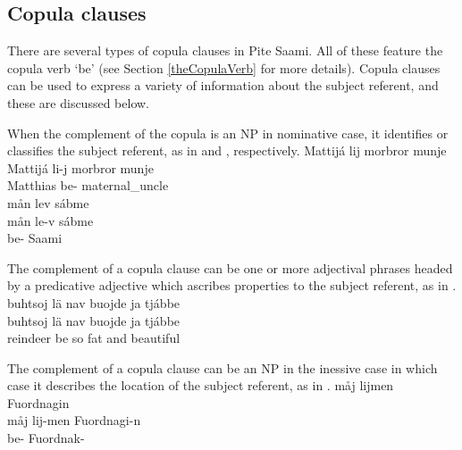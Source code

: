 \subsection{Copula clauses}\label{copulaClauses}
There are several types of copula clauses in Pite Saami. All of these feature the copula verb  ‘be’ %
(see Section \ref{theCopulaVerb} for more details). 
Copula clauses can be used to express a variety of information about the subject referent, and these are discussed below. 

When the complement of the copula is an NP in nominative case, it identifies or classifies the subject referent, as in  and , respectively.
\ea\label{copula1}
\glll	Mattijá lij morbror munje\\
	Mattijá li-j {morbror\footnotemark} munje\\
	Matthias\BS{} be- maternal\_uncle\BS{} \\\nopagebreak
{} %
\z
\ea\label{copula2}
\glll	mån lev sábme\\
	mån le-v sábme\\
	 be- Saami\BS{}\\\nopagebreak
{} 
\z
{}

The complement of a copula clause can be one or more adjectival phrases headed by a predicative adjective which ascribes properties to the subject referent, as in .
\ea\label{copula3}
\glll	buhtsoj lä nav buojde ja tjábbe\\
	buhtsoj lä nav buojde ja tjábbe\\
	reindeer\BS{} be\BS{} so fat\BS{} and beautiful\BS{}\\\nopagebreak
{} 
\z

The complement of a copula clause can be an NP in the inessive case in which case it describes the location of the subject referent, as in .
\ea\label{copula4}
\glll	måj lijmen Fuordnagin\\
	måj lij-men Fuordnagi-n\\
	 be- Fuordnak-\\\nopagebreak
{} 
\z

